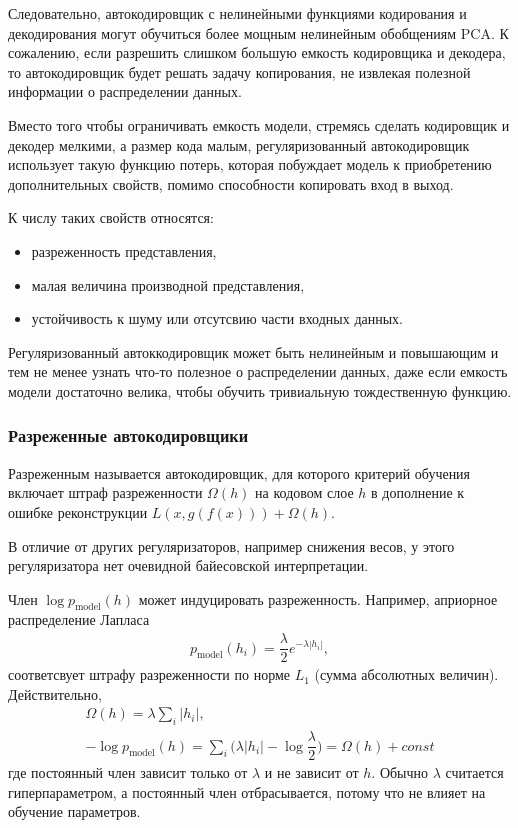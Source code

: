 \documentclass[%
	11pt,
	a4paper,
	utf8,
]{article}
\begin{document}
Следовательно, автокодировщик с нелинейными функциями кодирования и декодирования могут обучиться более мощным нелинейным обобщениям PCA. К сожалению, если разрешить слишком большую емкость кодировщика и декодера, то автокодировщик будет решать задачу копирования, не извлекая полезной информации о распределении данных.

Вместо того чтобы ограничивать емкость модели, стремясь сделать кодировщик и декодер мелкими, а размер кода малым, регуляризованный автокодировщик использует такую функцию потерь, которая побуждает модель к приобретению дополнительных свойств, помимо способности копировать вход в выход.

К числу таких свойств относятся:
\begin{itemize}
	\item разреженность представления,
	
	\item малая величина производной представления,
	
	\item устойчивость к шуму или отсутсвию части входных данных.
\end{itemize}

Регуляризованный автоккодировщик может быть нелинейным и повышающим и тем не менее узнать что-то полезное о распределении данных, даже если емкость модели достаточно велика, чтобы обучить тривиальную тождественную функцию.

\subsubsection{Разреженные автокодировщики}

Разреженным называется автокодировщик, для которого критерий обучения включает штраф разреженности $ \Omega(h) $ на кодовом слое $ h $ в дополнение к ошибке реконструкции $ L(x, g(f(x))) + \Omega(h) $.

В отличие от других регуляризаторов, например снижения весов, у этого регуляризатора нет очевидной байесовской интерпретации. 

Член $ \log p_{\text{model}} (h) $ может индуцировать разреженность. Например, априорное распределение Лапласа
\begin{align*}
	p_{ \text{model} }(h_i) = \dfrac{\lambda}{2} e^{-\lambda | h_i |},
\end{align*}
соответсвует штрафу разреженности по норме $ L_1 $ (сумма абсолютных величин). Действительно,
\begin{align*}
	\Omega(h) = \lambda \sum_i | h_i |, \\
	- \log p_{\text{model}}(h) = \sum_i \Big( \lambda | h_i | - \log \dfrac{\lambda}{2} \Big) = \Omega (h) + const
\end{align*}
где постоянный член зависит только от $ \lambda $ и не зависит от $ h $. Обычно $ \lambda $ считается гиперпараметром, а постоянный член отбрасывается, потому что не влияет на обучение параметров.
\end{document}
